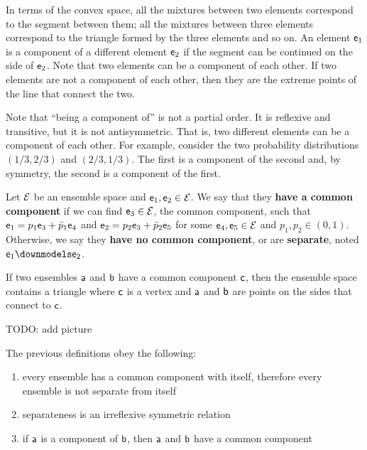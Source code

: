 \begin{remark}
	In terms of the convex space, all the mixtures between two elements correspond to the segment between them; all the mixtures between three elements correspond to the triangle formed by the three elements and so on. An element $\ens_1$ is a component of a different element $\ens_2$ if the segment can be continued on the side of $\ens_2$. Note that two elements can be a component of each other. If two elements are not a component of each other, then they are the extreme points of the line that connect the two.
\end{remark}

\begin{remark}
	Note that ``being a component of'' is not a partial order. It is reflexive and transitive, but it is not antisymmetric. That is, two different elements can be a component of each other. For example, consider the two probability distributions $(1/3, 2/3)$ and $(2/3, 1/3)$. The first is a component of the second and, by symmetry, the second is a component of the first.
\end{remark}


\begin{defn}
	Let $\Ens$ be an ensemble space and $\ens_1, \ens_2 \in \Ens$. We say that they \textbf{have a common component} if we can find $\ens_3 \in \Ens$, the common component, such that $\ens_1 = p_1 \ens_3 + \bar{p}_1 \ens_4$ and $\ens_2 = p_2 \ens_3 + \bar{p}_2 \ens_5$ for some $\ens_4, \ens_5 \in \Ens$ and $p_1, p_2 \in (0,1)$. Otherwise, we say they \textbf{have no common component}, or are \textbf{separate}, noted $\ens_1 \separate \ens_2$.
\end{defn}

\begin{remark}
	If two ensembles $\ens[a]$ and $\ens[b]$ have a common component $\ens[c]$, then the ensemble space contains a triangle where $\ens[c]$ is a vertex and $\ens[a]$ and $\ens[b]$ are points on the sides that connect to $\ens[c]$.
	
	TODO: add picture
\end{remark}

\begin{coro}
	The previous definitions obey the following:
	\begin{enumerate}
		\item every ensemble has a common component with itself, therefore every ensemble is not separate from itself
		\item separateness is an irreflexive symmetric relation
		\item if $\ens[a]$ is a component of $\ens[b]$, then $\ens[a]$ and $\ens[b]$ have a common component
	\end{enumerate}
\end{coro}

